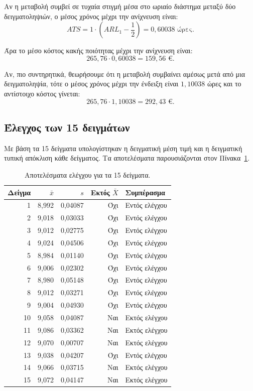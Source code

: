 \documentclass[12pt,a4paper]{article}
\begin{document}
Αν η μεταβολή συμβεί σε τυχαία στιγμή μέσα στο ωριαίο διάστημα μεταξύ δύο
δειγματοληψιών, ο μέσος χρόνος μέχρι την ανίχνευση είναι:
\[
    ATS=1\cdot\left(ARL_1-\frac{1}{2}\right)=0{,}60038 \text{ ώρες}.
\]

Άρα το μέσο κόστος κακής ποιότητας μέχρι την ανίχνευση είναι:
\[
    265{,}76\cdot 0{,}60038
    =
    \boxed{159{,}56 \text{ €}}.
\]

Αν, πιο συντηρητικά, θεωρήσουμε ότι η μεταβολή συμβαίνει αμέσως μετά από μια
δειγματοληψία, τότε ο μέσος χρόνος μέχρι την ένδειξη είναι \(1{,}10038\) ώρες
και το αντίστοιχο κόστος γίνεται:
\[
    265{,}76\cdot 1{,}10038 = 292{,}43 \text{ €}.
\]

\subsection{Έλεγχος των 15 δειγμάτων}

Με βάση τα 15 δείγματα υπολογίστηκαν η δειγματική μέση τιμή και η δειγματική
τυπική απόκλιση κάθε δείγματος. Τα αποτελέσματα παρουσιάζονται στον
Πίνακα~\ref{tab:samples}.

\begin{table}[H]
\centering
\caption{Αποτελέσματα ελέγχου για τα 15 δείγματα.}
\label{tab:samples}
\small
\begin{tabular}{rrrrl}
\toprule
\textbf{Δείγμα} & \textbf{\(\bar x\)} & \textbf{\(s\)} & \textbf{Εκτός \(\bar X\)} & \textbf{Συμπέρασμα} \\
\midrule
1 & 8,992 & 0,04087 & Όχι & Εντός ελέγχου \\
2 & 9,018 & 0,03033 & Όχι & Εντός ελέγχου \\
3 & 9,012 & 0,02775 & Όχι & Εντός ελέγχου \\
4 & 9,024 & 0,04506 & Όχι & Εντός ελέγχου \\
5 & 8,984 & 0,01140 & Όχι & Εντός ελέγχου \\
6 & 9,006 & 0,02302 & Όχι & Εντός ελέγχου \\
7 & 8,980 & 0,05148 & Όχι & Εντός ελέγχου \\
8 & 9,012 & 0,03271 & Όχι & Εντός ελέγχου \\
9 & 9,004 & 0,04930 & Όχι & Εντός ελέγχου \\
10 & 9,058 & 0,04087 & Ναι & Εκτός ελέγχου \\
11 & 9,086 & 0,03362 & Ναι & Εκτός ελέγχου \\
12 & 9,070 & 0,00707 & Ναι & Εκτός ελέγχου \\
13 & 9,038 & 0,04207 & Όχι & Εντός ελέγχου \\
14 & 9,066 & 0,03715 & Ναι & Εκτός ελέγχου \\
15 & 9,072 & 0,04147 & Ναι & Εκτός ελέγχου \\
\bottomrule
\end{tabular}
\end{table}
\end{document}

